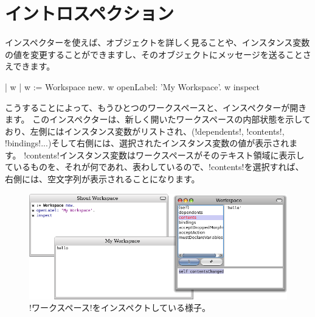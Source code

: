 \documentclass[a4paper,10pt,twoside]{book}
\begin{document}
\section{イントロスペクション}

インスペクターを使えば、オブジェクトを詳しく見ることや、インスタンス変数の値を変更することができますし、そのオブジェクトにメッセージを送ることさえできます。

\begin{code}{| w |}
w := Workspace new.
w openLabel: 'My Workspace'.
w inspect
\end{code}

こうすることによって、もうひとつのワークスペースと、インスペクターが開きます。
このインスペクターは、新しく開いたワークスペースの内部状態を示しており、左側にはインスタンス変数がリストされ、(\ct!dependents!, \ct!contents!, \ct!bindings!...)そして右側には、選択されたインスタンス変数の値が表示されます。
\ct!contents!インスタンス変数はワークスペースがそのテキスト領域に表示しているものを、それが何であれ、表わしているので、\ct!contents!を選択すれば、右側には、空文字列が表示されることになります。

\begin{figure}[ht]\centering
	\includegraphics[width=\linewidth]{workspaceInspector}
	\caption{\ct!ワークスペース!をインスペクトしている様子。}
\end{figure}
\end{document}
